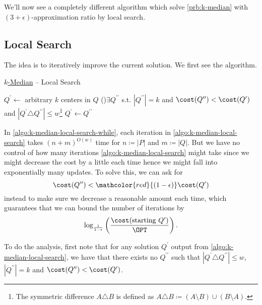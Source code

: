 We'll now see a completely different algorithm which solve \autoref{prb:k-median} with \((3 + \epsilon )\)-approximation ratio by local search.
\subsection{Local Search}
The idea is to iteratively improve the current solution. We first see the algorithm.

\begin{algorithm}[H]\label{algo:k-median-local-search}
	\DontPrintSemicolon{}
	\caption{\hyperref[prb:k-median]{\(k\)-Median} -- Local Search}
	\BlankLine

	\(Q^\prime \gets \) arbitrary \(k\) centers in \(Q\)\;
	\While(\label{algo:k-median-local-search-while}){\(\exists Q^{\prime\prime}\) s.t. \(\left\vert Q^{\prime\prime} \right\vert = k \) and \(\cost(Q^{\prime\prime}) < \cost(Q^\prime )\) and \(\left\vert Q^\prime \triangle Q^{\prime\prime} \right\vert \leq w\)\footnote{The symmetric difference \(A \triangle B\) is defined as \(A \triangle B \coloneqq (A \setminus B) \cup (B\setminus A)\).}}{
		\(Q^\prime \gets Q^{\prime\prime}\)\;
	}
	\;
\end{algorithm}

\begin{remark}[Runtime]
	In \autoref{algo:k-median-local-search-while}, each iteration in \autoref{algo:k-median-local-search} takes \((n+m)^{O(w)}\) time for \(n \coloneqq \left\vert P \right\vert \) and \(m \coloneqq \left\vert Q \right\vert \). But we have no control of how many iterations \autoref{algo:k-median-local-search} might take since we might decrease the cost by a little each time hence we might fall into exponentially many updates. To solve this, we can ask for
	\[
		\cost(Q^{\prime\prime}) < \mathcolor{red}{(1 - \epsilon )}\cost(Q^\prime )
	\]
	instead to make sure we decrease a reasonable amount each time, which guarantees that we can bound the number of iterations by
	\[
		\log_\frac{1}{1-\epsilon } \left( \frac{\cost(\text{starting } Q^\prime )}{\OPT} \right).
	\]
\end{remark}

To do the analysis, first note that for any solution \(Q^\prime \) output from \autoref{algo:k-median-local-search}, we have that there exists no \(Q^{\prime\prime}\) such that \(\left\vert Q^\prime \triangle Q^{\prime\prime} \right\vert \leq w\), \(\left\vert Q^{\prime\prime} \right\vert = k\) and \(\cost(Q^{\prime\prime}) < \cost(Q^\prime )\).

